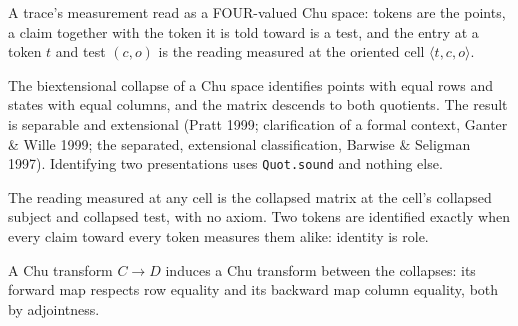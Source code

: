 \begin{definition}\label{thm:measured-chu}\leanok{}
A trace's measurement read as a FOUR-valued Chu space: tokens are the points, a
claim together with the token it is told toward is a test, and the entry at a
token \(t\) and test \((c, o)\) is the reading measured at the oriented cell
\(\langle t, c, o\rangle\).
\end{definition}
\begin{definition}\label{thm:root-identification}\leanok{}
The biextensional collapse of a Chu space identifies points with equal rows and
states with equal columns, and the matrix descends to both quotients. The result
is separable and extensional (Pratt 1999; clarification of a formal context,
Ganter \& Wille 1999; the separated, extensional classification, Barwise \&
Seligman 1997). Identifying two presentations uses \texttt{Quot.sound} and
nothing else.
\end{definition}
\begin{theorem}\label{thm:measure-factors-collapse}\leanok{}
The reading measured at any cell is the collapsed matrix at the cell's collapsed
subject and collapsed test, with no axiom. Two tokens are identified exactly when
every claim toward every token measures them alike: identity is role.
\end{theorem}
\begin{theorem}\label{thm:chu-collapse-descends}\leanok{}
A Chu transform \(C \to D\) induces a Chu transform between the collapses: its
forward map respects row equality and its backward map column equality, both by
adjointness.
\end{theorem}
